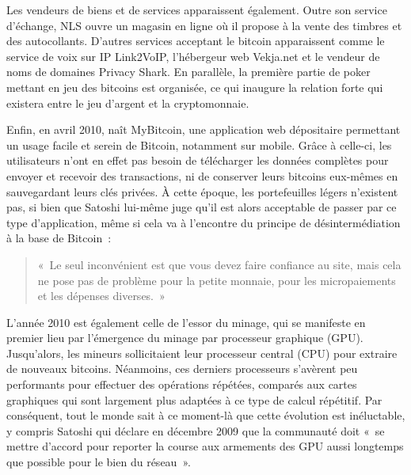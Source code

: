 Les vendeurs de biens et de services apparaissent également. Outre son service d'échange, NLS ouvre un magasin en ligne où il propose à la vente des timbres et des autocollants. D'autres services acceptant le bitcoin apparaissent comme le service de voix sur IP Link2VoIP, l'hébergeur web Vekja.net et le vendeur de noms de domaines Privacy Shark. En parallèle, la première partie de poker mettant en jeu des bitcoins est organisée, ce qui inaugure la relation forte qui existera entre le jeu d'argent et la cryptomonnaie.

Enfin, en avril 2010, naît MyBitcoin, une application web dépositaire permettant un usage facile et serein de Bitcoin, notamment sur mobile. Grâce à celle-ci, les utilisateurs n'ont en effet pas besoin de télécharger les données complètes pour envoyer et recevoir des transactions, ni de conserver leurs bitcoins eux-mêmes en sauvegardant leurs clés privées. À cette époque, les portefeuilles légers n'existent pas, si bien que Satoshi lui-même juge qu'il est alors acceptable de passer par ce type d'application, même si cela va à l'encontre du principe de désintermédiation à la base de Bitcoin~:

\begin{quote}
«~Le seul inconvénient est que vous devez faire confiance au site, mais cela ne pose pas de problème pour la petite monnaie, pour les micropaiements et les dépenses diverses.~»
\end{quote}


L'année 2010 est également celle de l'essor du minage, qui se manifeste en premier lieu par l'émergence du minage par processeur graphique (GPU). Jusqu'alors, les mineurs sollicitaient leur processeur central (CPU) pour extraire de nouveaux bitcoins. Néanmoins, ces derniers processeurs s'avèrent peu performants pour effectuer des opérations répétées, comparés aux cartes graphiques qui sont largement plus adaptées à ce type de calcul répétitif. Par conséquent, tout le monde sait à ce moment-là que cette évolution est inéluctable, y compris Satoshi qui déclare en décembre 2009 que la communauté doit «~se mettre d'accord pour reporter la course aux armements des GPU aussi longtemps que possible pour le bien du réseau~».

